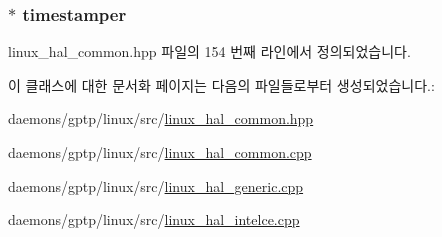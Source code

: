 \subsubsection[{\texorpdfstring{timestamper}{timestamper}}]{$\ast$ timestamper\hspace{0.3cm}{\ttfamily [private]}}\hypertarget{class_linux_network_interface_a47975f2b80d6d5e6fc426813df74feeb}{}\label{class_linux_network_interface_a47975f2b80d6d5e6fc426813df74feeb}


linux\+\_\+hal\+\_\+common.\+hpp 파일의 154 번째 라인에서 정의되었습니다.



이 클래스에 대한 문서화 페이지는 다음의 파일들로부터 생성되었습니다.\+:\begin{DoxyCompactItemize}
\item 
daemons/gptp/linux/src/\hyperlink{linux__hal__common_8hpp}{linux\+\_\+hal\+\_\+common.\+hpp}\item 
daemons/gptp/linux/src/\hyperlink{linux__hal__common_8cpp}{linux\+\_\+hal\+\_\+common.\+cpp}\item 
daemons/gptp/linux/src/\hyperlink{linux__hal__generic_8cpp}{linux\+\_\+hal\+\_\+generic.\+cpp}\item 
daemons/gptp/linux/src/\hyperlink{linux__hal__intelce_8cpp}{linux\+\_\+hal\+\_\+intelce.\+cpp}\end{DoxyCompactItemize}
